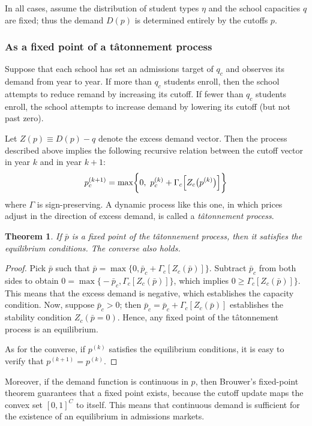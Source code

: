 \documentclass[12pt]{article}
\newtheorem{theorem}{Theorem}
\theoremstyle{definition}
\begin{document}
In all cases, assume the distribution of student types $\eta$ and the school capacities $q$ are fixed; thus the demand $D(p)$ is determined entirely by the cutoffs $p$. 

\subsubsection{As a fixed point of a t\^{a}tonnement process} \label{asafixedpoint}
Suppose that each school has set an admissions target of $q_c$ and observes its demand from year to year. If more than $q_c$ students enroll, then the school attempts to reduce remand by increasing its cutoff. If fewer than $q_c$ students enroll, the school attempts to increase demand by lowering its cutoff (but not past zero). 

Let $Z(p) \equiv D(p) - q$ denote the excess demand vector. Then the process described above implies the following recursive relation between the cutoff vector in year $k$ and in year $k+1$:
\[p_c^{(k+1)} = \max\biggl\{0,~p_c^{(k)}+ \Gamma_c\Bigl[Z_c\bigl(p^{(k)}\bigr)\Bigr] \biggr\}\]
where $\Gamma$ is sign-preserving. A dynamic process like this one, in which prices adjust in the direction of excess demand, is called a \emph{t\^{a}tonnement process}.
\begin{theorem}
If $\bar p$ is a fixed point of the t\^{a}tonnement process, then it satisfies the equilibrium conditions. The converse also holds.
\end{theorem}
\begin{proof} Pick $\bar p$ such that $\bar p = \max\bigl\{0, \bar p_c + \Gamma_c\left[Z_c(\bar p)\right] \bigr\}$. Subtract $\bar p_c$ from both sides to obtain $0 = \max\bigl\{-\bar p_c,\Gamma_c\left[Z_c(\bar p)\right] \bigr\}$, which implies $0 \geq \Gamma_c\left[Z_c(\bar p)\right] \bigr\}$. This means that the excess demand is negative, which establishes the capacity condition. Now, suppose $\bar p_c > 0$; then $\bar p_c =  \bar p_c + \Gamma_c\left[Z_c(\bar p)\right] $ establishes the stability condition $Z_c(\bar p = 0)$. Hence, any fixed point of the t\^{a}tonnement process is an equilibrium. 

As for the converse, if $p^{(k)}$ satisfies the equilibrium conditions, it is easy to verify that $p^{(k+1)} = p^{(k)}$. \end{proof}

Moreover, if the demand function is continuous in $p$, then Brouwer's fixed-point theorem guarantees that a fixed point exists, because the cutoff update maps the convex set $[0, 1]^C$ to itself. This means that continuous demand is sufficient for the existence of an equilibrium in admissions markets. 
\end{document}

